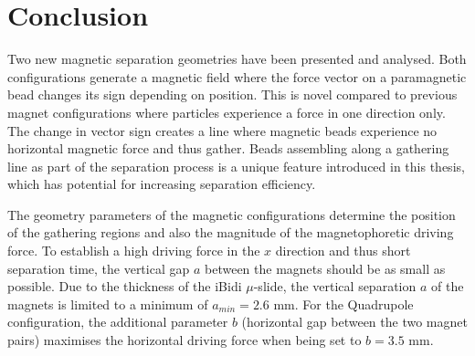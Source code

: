 


\section{Conclusion}\label{sec:conclusionMagneticSeparationDesign}
Two new magnetic separation geometries have been presented and analysed. Both configurations generate a magnetic field where the force vector on a paramagnetic bead changes its sign depending on position. This is novel compared to previous magnet configurations where particles experience a force in one direction only. The change in vector sign creates a line where magnetic beads experience no horizontal magnetic force and thus gather. Beads assembling along a gathering line as part of the separation process is a unique feature introduced in this thesis, which has potential for increasing separation efficiency.

The geometry parameters of the magnetic configurations determine the position of the gathering regions and also the magnitude of the magnetophoretic driving force. To establish a high driving force in the $x$ direction and thus short separation time, the vertical gap $a$ between the magnets should be as small as possible. Due to the thickness of the iBidi $\mu$-slide, the vertical separation $a$ of the magnets is limited to a minimum of $a_{min} = 2.6$ mm. For the Quadrupole configuration, the additional parameter $b$ (horizontal gap between the two magnet pairs) maximises the horizontal driving force when being set to $b=3.5$ mm.

